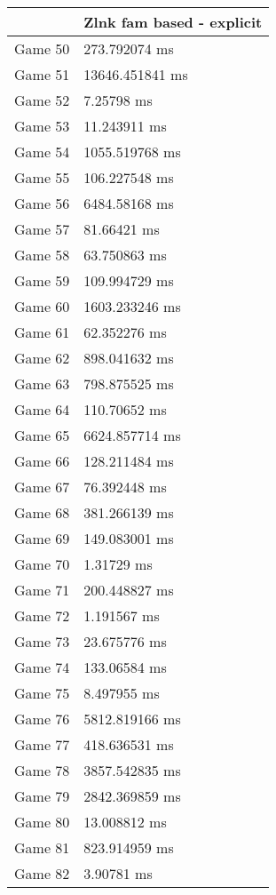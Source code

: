 \begin{tabular}{|l|l|}
	\hline
	& Zlnk fam based - explicit \\ \hline
	Game 50 & 273.792074 ms \\ \hline
	Game 51 & 13646.451841 ms \\ \hline
	Game 52 & 7.25798 ms \\ \hline
	Game 53 & 11.243911 ms \\ \hline
	Game 54 & 1055.519768 ms \\ \hline
	Game 55 & 106.227548 ms \\ \hline
	Game 56 & 6484.58168 ms \\ \hline
	Game 57 & 81.66421 ms \\ \hline
	Game 58 & 63.750863 ms \\ \hline
	Game 59 & 109.994729 ms \\ \hline
	Game 60 & 1603.233246 ms \\ \hline
	Game 61 & 62.352276 ms \\ \hline
	Game 62 & 898.041632 ms \\ \hline
	Game 63 & 798.875525 ms \\ \hline
	Game 64 & 110.70652 ms \\ \hline
	Game 65 & 6624.857714 ms \\ \hline
	Game 66 & 128.211484 ms \\ \hline
	Game 67 & 76.392448 ms \\ \hline
	Game 68 & 381.266139 ms \\ \hline
	Game 69 & 149.083001 ms \\ \hline
	Game 70 & 1.31729 ms \\ \hline
	Game 71 & 200.448827 ms \\ \hline
	Game 72 & 1.191567 ms \\ \hline
	Game 73 & 23.675776 ms \\ \hline
	Game 74 & 133.06584 ms \\ \hline
	Game 75 & 8.497955 ms \\ \hline
	Game 76 & 5812.819166 ms \\ \hline
	Game 77 & 418.636531 ms \\ \hline
	Game 78 & 3857.542835 ms \\ \hline
	Game 79 & 2842.369859 ms \\ \hline
	Game 80 & 13.008812 ms \\ \hline
	Game 81 & 823.914959 ms \\ \hline
	Game 82 & 3.90781 ms \\ \hline

\end{tabular}
